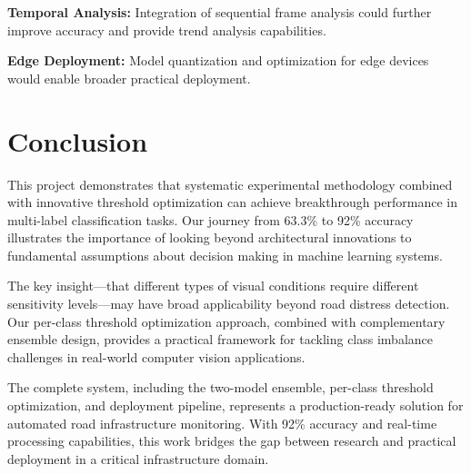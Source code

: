 \documentclass[12pt]{article}
\begin{document}
\textbf{Temporal Analysis:} Integration of sequential frame analysis could further improve accuracy and provide trend analysis capabilities.

\textbf{Edge Deployment:} Model quantization and optimization for edge devices would enable broader practical deployment.

\section{Conclusion}

This project demonstrates that systematic experimental methodology combined with innovative threshold optimization can achieve breakthrough performance in multi-label classification tasks. Our journey from 63.3\% to 92\% accuracy illustrates the importance of looking beyond architectural innovations to fundamental assumptions about decision making in machine learning systems.

The key insight—that different types of visual conditions require different sensitivity levels—may have broad applicability beyond road distress detection. Our per-class threshold optimization approach, combined with complementary ensemble design, provides a practical framework for tackling class imbalance challenges in real-world computer vision applications.

The complete system, including the two-model ensemble, per-class threshold optimization, and deployment pipeline, represents a production-ready solution for automated road infrastructure monitoring. With 92\% accuracy and real-time processing capabilities, this work bridges the gap between research and practical deployment in a critical infrastructure domain.
\end{document}
